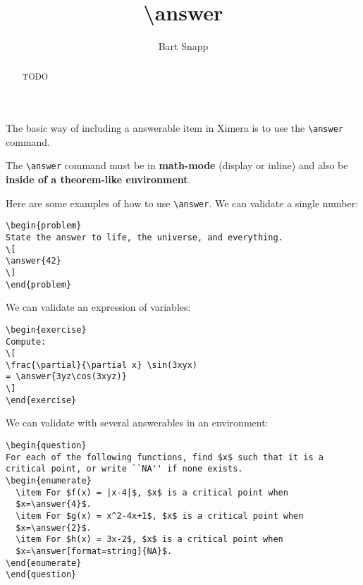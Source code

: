 \documentclass{ximera}
\title{\textbackslash answer}
\author{Bart Snapp}
\begin{document}
\begin{abstract}
  TODO
\end{abstract}
\maketitle


The basic way of including a answerable item in Ximera is to use the
\verb|\answer| command.

\begin{warning}
  The \verb|\answer| command must be in \textbf{math-mode} (display or inline)
  and also be \textbf{inside of a
    theorem-like environment}.
\end{warning}
Here are some examples of how to use \verb!\answer!. We can validate a single
number:
\begin{verbatim}
\begin{problem}
State the answer to life, the universe, and everything.
\[
\answer{42}
\]
\end{problem}
\end{verbatim}
We can validate an expression of variables:
\begin{verbatim}
\begin{exercise}
Compute:
\[
\frac{\partial}{\partial x} \sin(3xyx) 
= \answer{3yz\cos(3xyz)}
\]
\end{exercise}
\end{verbatim}
We can validate with several answerables in an environment:
\begin{verbatim}
\begin{question}
For each of the following functions, find $x$ such that it is a
critical point, or write ``NA'' if none exists.
\begin{enumerate}
  \item For $f(x) = |x-4|$, $x$ is a critical point when 
  $x=\answer{4}$.
  \item For $g(x) = x^2-4x+1$, $x$ is a critical point when 
  $x=\answer{2}$.
  \item For $h(x) = 3x-2$, $x$ is a critical point when 
  $x=\answer[format=string]{NA}$.
\end{enumerate}
\end{question}
\end{verbatim}
\end{document}
